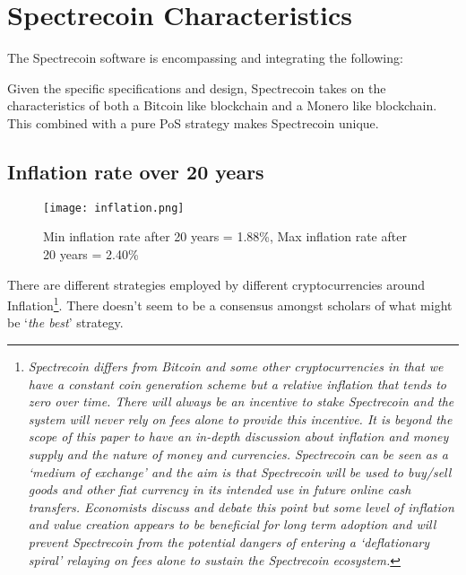 \section{Spectrecoin Characteristics}
The Spectrecoin software is encompassing and integrating the following:

\begin{table}[h]
\end{table}
\noindent
Given the specific specifications and design, Spectrecoin takes on the characteristics of both a Bitcoin like blockchain and a Monero like blockchain. This combined with a pure PoS strategy makes Spectrecoin unique.

\subsection{Inflation rate over 20 years}
\begin{figure}[h]
	\centering
	\texttt{[image: inflation.png]}
	\caption{Min inflation rate after 20 years = 1.88\%, Max inflation 
	rate after 20 years = 2.40\% }
\end{figure}
\noindent
There are different strategies employed by different cryptocurrencies around 
Inflation\footnote{\textit{Spectrecoin differs from Bitcoin and some other 
cryptocurrencies in that we have a constant coin generation scheme 
but a relative inflation that tends to zero over time. There will 
always be an incentive to stake Spectrecoin and the system will never 
rely on fees alone to provide this incentive. It is beyond the scope 
of this paper to have an in-depth discussion about inflation and money 
supply and the nature of money and currencies. Spectrecoin can be seen 
as a ‘medium of exchange’ and the aim is that Spectrecoin will be used 
to buy/sell goods and other fiat currency in its intended use in future 
online cash transfers. Economists discuss and debate this point but some 
level of inflation and value creation appears to be beneficial for long 
term adoption and will prevent Spectrecoin from the potential dangers of 
entering a ‘deflationary spiral’ relaying on fees alone to sustain the 
Spectrecoin ecosystem.}}. There doesn’t seem to be a consensus amongst 
scholars of what might be ‘\textit{the best}’ strategy.
\newpage

